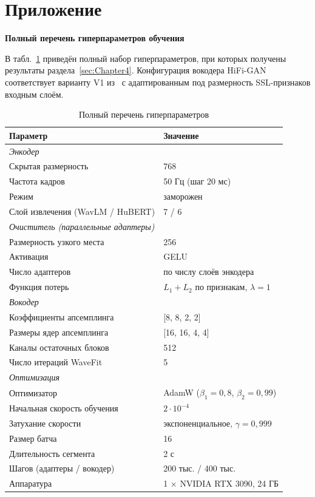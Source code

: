 \section*{Приложение}
\label{sec:Apendix} 

\begin{center}
    \textbf{Полный перечень гиперпараметров обучения}
\end{center}

В табл.~\ref{tab:full-hparams} приведён полный набор гиперпараметров, при которых
получены результаты раздела~\ref{sec:Chapter4}. Конфигурация вокодера HiFi-GAN
соответствует варианту V1 из~\cite{hifigan} с адаптированным под размерность
SSL-признаков входным слоём.

\begin{table}[H]
    \caption{Полный перечень гиперпараметров}
    \label{tab:full-hparams}
    \centering
    \footnotesize
    \begin{tabularx}{\textwidth}{X l}
        \toprule
        Параметр & Значение \\
        \midrule
        \multicolumn{2}{l}{\textit{Энкодер}} \\
        Скрытая размерность & 768 \\
        Частота кадров & 50 Гц (шаг 20 мс) \\
        Режим & заморожен \\
        Слой извлечения (WavLM / HuBERT) & 7 / 6 \\
        \midrule
        \multicolumn{2}{l}{\textit{Очиститель (параллельные адаптеры)}} \\
        Размерность узкого места & 256 \\
        Активация & GELU \\
        Число адаптеров & по числу слоёв энкодера \\
        Функция потерь & $L_1 + L_2$ по признакам, $\lambda=1$ \\
        \midrule
        \multicolumn{2}{l}{\textit{Вокодер}} \\
        Коэффициенты апсемплинга & [8, 8, 2, 2] \\
        Размеры ядер апсемплинга & [16, 16, 4, 4] \\
        Каналы остаточных блоков & 512 \\
        Число итераций WaveFit & 5 \\
        \midrule
        \multicolumn{2}{l}{\textit{Оптимизация}} \\
        Оптимизатор & AdamW ($\beta_1=0{,}8$, $\beta_2=0{,}99$) \\
        Начальная скорость обучения & $2\cdot10^{-4}$ \\
        Затухание скорости & экспоненциальное, $\gamma=0{,}999$ \\
        Размер батча & 16 \\
        Длительность сегмента & 2 с \\
        Шагов (адаптеры / вокодер) & 200 тыс. / 400 тыс. \\
        Аппаратура & 1 $\times$ NVIDIA RTX 3090, 24 ГБ \\
        \bottomrule
    \end{tabularx}
\end{table}
